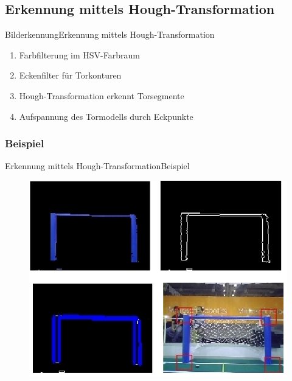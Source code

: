 \documentclass{beamer}
\begin{document}
\subsection{Erkennung mittels Hough-Transformation}
\begin{frame}{Bilderkennung}{Erkennung mittels Hough-Transformation}
\begin{enumerate}
    \item Farbfilterung im HSV-Farbraum
    \item Eckenfilter für Torkonturen
    \item Hough-Transformation erkennt Torsegmente
    \item Aufspannung des Tormodells durch Eckpunkte
\end{enumerate}
\end{frame}

\subsubsection{Beispiel}
\begin{frame}{Erkennung mittels Hough-Transformation}{Beispiel}
\begin{figure}[htp]
\centering
\includegraphics[scale=0.5]{hough-transformation-method.png}
\end{figure}
\end{frame}
\end{document}
